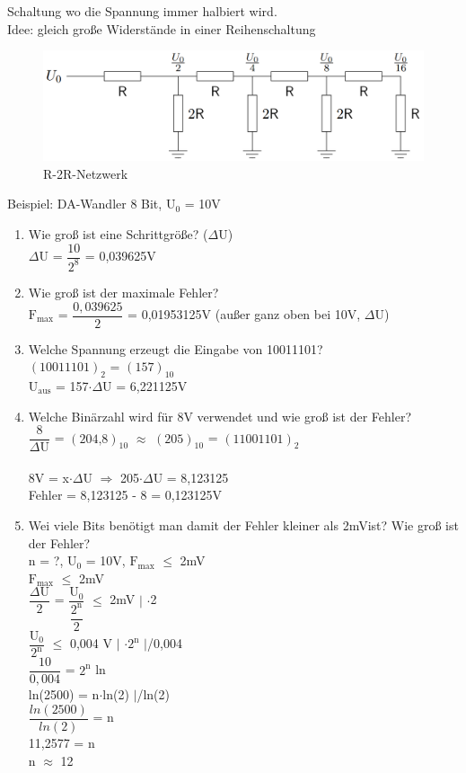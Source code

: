 Schaltung wo die Spannung immer halbiert wird. \\
Idee: gleich große Widerstände in einer Reihenschaltung

\begin{figure}[H]
	\centering
	\includegraphics[width=0.8\linewidth]{figures/r2r.png}
	\caption{R-2R-Netzwerk}
\end{figure}

Beispiel: DA-Wandler 8 Bit, $\text{U}_0$ = 10V \\
\begin{enumerate}
	\item Wie groß ist eine Schrittgröße? ($\Delta$U) \\
	$\Delta$U = $\dfrac{10}{2^{8}}$ = 0,039625V
	\item Wie groß ist der maximale Fehler? \\
	$\text{F}_{\text{max}}$ = $\dfrac{0,039625}{2}$ = 0,01953125V (außer ganz oben bei 10V, $\Delta$U)
	\item Welche Spannung erzeugt die Eingabe von 10011101? \\
	$(\text{10011101})_2$ = $(\text{157})_{10}$ \\
	$\text{U}_{\text{aus}}$ = 157$\cdot$$\Delta$U = 6,221125V
	\item Welche Binärzahl wird für 8V verwendet und wie groß ist der Fehler? \\
	$\dfrac{8}{\Delta\text{U}}$ = $(\text{204,8})_{10}$ $\approx$ $(\text{205})_{10}$ = $(\text{11001101})_2$ \\ \\
	8V = x$\cdot$$\Delta$U $\Rightarrow$ 205$\cdot$$\Delta$U = 8,123125 \\
	Fehler = 8,123125 - 8 = 0,123125V
	\item Wei viele Bits benötigt man damit der Fehler kleiner als 2mVist? Wie groß ist der Fehler? \\
	n = ?, $\text{U}_0$ = 10V, $\text{F}_{\text{max}}$ $\le$ 2mV \\
	$\text{F}_{\text{max}}$ $\le$ 2mV \\
	$\dfrac{\Delta\text{U}}{2}$ = $\dfrac{\text{U}_0}{\dfrac{2^\text{n}}{2}}$ $\le$ 2mV \quad$\vert$ $\cdot$2 \\
	$\dfrac{\text{U}_0}{2^\text{n}}$ $\le$ 0,004 V \quad$\vert$ $\cdot$$2^\text{n}$ \quad$\vert$/0,004 \\
	$\dfrac{10}{0,004}$ = $2^\text{n}$ \quad ln \\
	ln(2500) = n$\cdot$ln(2) \quad$\vert$/ln(2) \\
	$\dfrac{ln(2500)}{ln(2)}$ = n \\
	11,2577 = n \\
	n $\approx$ 12 \\
	

\end{enumerate}
